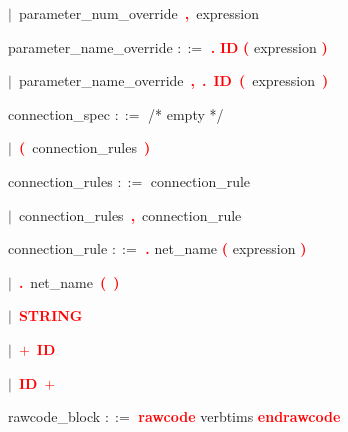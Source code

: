 \mbox{$|$ parameter\_num\_override \textbf{\textcolor{red}{,}} expression}

\vspace{1em}
\noindent
\settowidth{\parindent}{\hspace{4ex}}
parameter\_name\_override $::=$\hspace{1ex} \textbf{\textcolor{red}{.}} \textbf{\textcolor{red}{ID}} \textbf{\textcolor{red}{(}} expression \textbf{\textcolor{red}{)}}

\mbox{$|$ parameter\_name\_override \textbf{\textcolor{red}{,}} \textbf{\textcolor{red}{.}} \textbf{\textcolor{red}{ID}} \textbf{\textcolor{red}{(}} expression \textbf{\textcolor{red}{)}}}

\vspace{1em}
\noindent
\settowidth{\parindent}{\hspace{4ex}}
connection\_spec $::=$\hspace{1ex} /* empty */

\mbox{$|$ \textbf{\textcolor{red}{(}} connection\_rules \textbf{\textcolor{red}{)}}}

\vspace{1em}
\noindent
\settowidth{\parindent}{\hspace{4ex}}
connection\_rules $::=$\hspace{1ex} connection\_rule

\mbox{$|$ connection\_rules \textbf{\textcolor{red}{,}} connection\_rule}

\vspace{1em}
\noindent
\settowidth{\parindent}{\hspace{4ex}}
connection\_rule $::=$\hspace{1ex} \textbf{\textcolor{red}{.}} net\_name \textbf{\textcolor{red}{(}} expression \textbf{\textcolor{red}{)}}

\mbox{$|$ \textbf{\textcolor{red}{.}} net\_name \textbf{\textcolor{red}{(}} \textbf{\textcolor{red}{)}}}

\mbox{$|$ \textbf{\textcolor{red}{STRING}}}

\mbox{$|$ \textbf{\textcolor{red}{$+$}} \textbf{\textcolor{red}{ID}}}

\mbox{$|$ \textbf{\textcolor{red}{ID}} \textbf{\textcolor{red}{$+$}}}

\vspace{1em}
\noindent
\settowidth{\parindent}{\hspace{4ex}}
rawcode\_block $::=$\hspace{1ex} \textbf{\textcolor{red}{rawcode}} verbtims \textbf{\textcolor{red}{endrawcode}}

